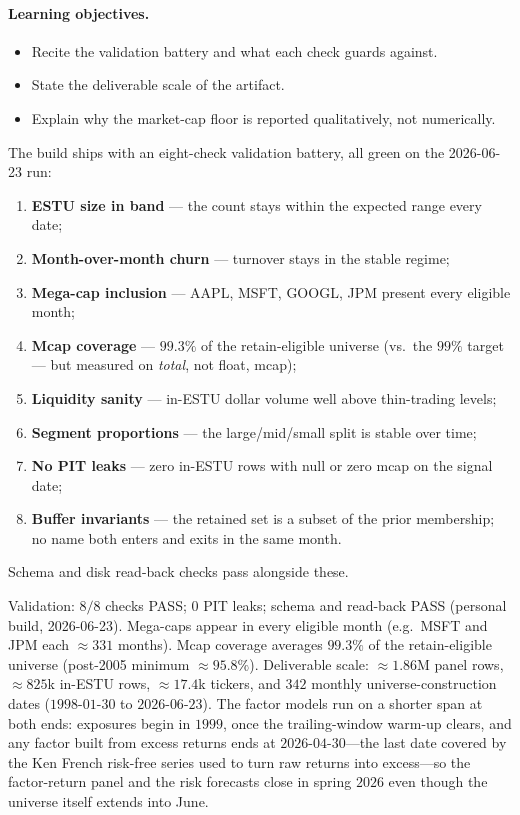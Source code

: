 \documentclass[11pt]{article}
\theoremstyle{definition}
\theoremstyle{plain}
\theoremstyle{remark}
\begin{document}
\paragraph{Learning objectives.}
\begin{itemize}[nosep,leftmargin=1.4em]
  \item Recite the validation battery and what each check guards against.
  \item State the deliverable scale of the artifact.
  \item Explain why the market-cap floor is reported qualitatively, not numerically.
\end{itemize}

The build ships with an eight-check validation battery, all green on the 2026-06-23 run:
\begin{enumerate}[nosep,leftmargin=1.6em]
  \item \textbf{ESTU size in band} --- the count stays within the expected range every date;
  \item \textbf{Month-over-month churn} --- turnover stays in the stable regime;
  \item \textbf{Mega-cap inclusion} --- AAPL, MSFT, GOOGL, JPM present every eligible month;
  \item \textbf{Mcap coverage} --- $99.3\%$ of the retain-eligible universe (vs.\ the $99\%$ target --- but measured on \emph{total}, not float, mcap);
  \item \textbf{Liquidity sanity} --- in-ESTU dollar volume well above thin-trading levels;
  \item \textbf{Segment proportions} --- the large/mid/small split is stable over time;
  \item \textbf{No PIT leaks} --- zero in-ESTU rows with null or zero mcap on the signal date;
  \item \textbf{Buffer invariants} --- the retained set is a subset of the prior membership; no name both enters and exits in the same month.
\end{enumerate}
Schema and disk read-back checks pass alongside these.

\begin{observed}
Validation: $8/8$ checks PASS; $0$ PIT leaks; schema and read-back PASS (personal build, 2026-06-23). Mega-caps appear in every eligible month (e.g.\ MSFT and JPM each $\approx 331$ months). Mcap coverage averages $99.3\%$ of the retain-eligible universe (post-2005 minimum $\approx 95.8\%$). Deliverable scale: $\approx 1.86$M panel rows, $\approx 825$k in-ESTU rows, $\approx 17.4$k tickers, and $342$ monthly universe-construction dates ($1998$-$01$-$30$ to $2026$-$06$-$23$). The factor models run on a shorter span at both ends: exposures begin in $1999$, once the trailing-window warm-up clears, and any factor built from excess returns ends at $2026$-$04$-$30$---the last date covered by the Ken French risk-free series used to turn raw returns into excess---so the factor-return panel and the risk forecasts close in spring $2026$ even though the universe itself extends into June.
\end{observed}
\end{document}
